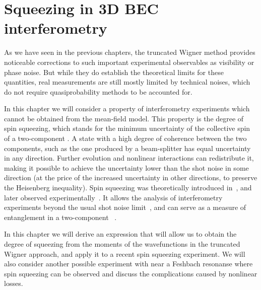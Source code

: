 \chapter{Squeezing in 3D BEC interferometry}
\label{cha:bec-squeezing}

As we have seen in the previous chapters, the truncated Wigner method provides noticeable corrections to such important experimental observables as visibility or phase noise.
But while they do establish the theoretical limits for these quantities, real measurements are still mostly limited by technical noises, which do not require quasiprobability methods to be accounted for.

In this chapter we will consider a property of  interferometry experiments which cannot be obtained from the mean-field model.
This property is the degree of spin squeezing, which stands for the minimum uncertainty of the collective spin of a two-component .
A state with a high degree of coherence between the two components, such as the one produced by a beam-splitter has equal uncertainty in any direction.
Further evolution and nonlinear interactions can redistribute it, making it possible to achieve the uncertainty lower than the shot noise in some direction (at the price of the increased uncertainty in other directions, to preserve the Heisenberg inequality).
Spin squeezing was theoretically introduced in~\cite{Kitagawa1993,Wineland1994}, and later observed experimentally~\cite{Hald1999,Kuzmich2000}.
It allows the analysis of interferometry experiments beyond the usual shot noise limit~\cite{Riedel2010,Gross2010}, and can serve as a measure of entanglement in a two-component ~\cite{Sorensen2001}.

In this chapter we will derive an expression that will allow us to obtain the degree of squeezing from the moments of the wavefunctions in the truncated Wigner approach, and apply it to a recent spin squeezing experiment.
We will also consider another possible experiment with  near a Feshbach resonanse where spin squeezing can be observed and discuss the complications caused by nonlinear losses.





